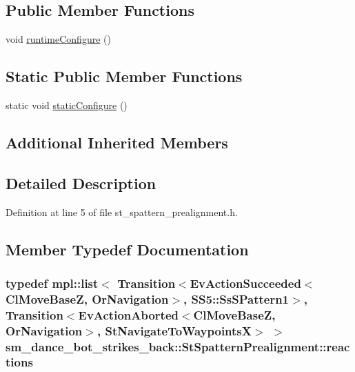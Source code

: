 \subsection*{Public Member Functions}
\begin{DoxyCompactItemize}
\item 
void \hyperlink{structsm__dance__bot__strikes__back_1_1StSpatternPrealignment_ad9edd102ef86322d26c9c03a757805b3}{runtime\+Configure} ()
\end{DoxyCompactItemize}
\subsection*{Static Public Member Functions}
\begin{DoxyCompactItemize}
\item 
static void \hyperlink{structsm__dance__bot__strikes__back_1_1StSpatternPrealignment_a2e36a50e251ee0b35a8187dca30d52b2}{static\+Configure} ()
\end{DoxyCompactItemize}
\subsection*{Additional Inherited Members}


\subsection{Detailed Description}


Definition at line 5 of file st\+\_\+spattern\+\_\+prealignment.\+h.



\subsection{Member Typedef Documentation}
\subsubsection[{\texorpdfstring{reactions}{reactions}}]{\setlength{\rightskip}{0pt plus 5cm}typedef mpl\+::list$<$ Transition$<$Ev\+Action\+Succeeded$<${\bf Cl\+Move\+BaseZ}, {\bf Or\+Navigation}$>$, {\bf S\+S5\+::\+Ss\+S\+Pattern1}$>$, Transition$<$Ev\+Action\+Aborted$<${\bf Cl\+Move\+BaseZ}, {\bf Or\+Navigation}$>$, {\bf St\+Navigate\+To\+WaypointsX}$>$ $>$ {\bf sm\+\_\+dance\+\_\+bot\+\_\+strikes\+\_\+back\+::\+St\+Spattern\+Prealignment\+::reactions}}\hypertarget{structsm__dance__bot__strikes__back_1_1StSpatternPrealignment_ac474c30f4538ff38707a3ce571a635a0}{}\label{structsm__dance__bot__strikes__back_1_1StSpatternPrealignment_ac474c30f4538ff38707a3ce571a635a0}


